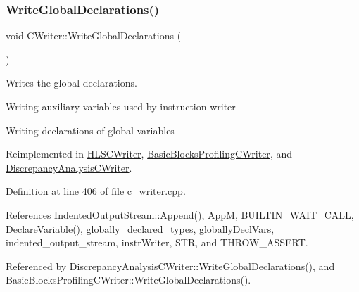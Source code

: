\subsubsection{\texorpdfstring{Write\+Global\+Declarations()}{WriteGlobalDeclarations()}}
{\footnotesize\ttfamily void C\+Writer\+::\+Write\+Global\+Declarations (\begin{DoxyParamCaption}{ }\end{DoxyParamCaption})\hspace{0.3cm}{\ttfamily [virtual]}}



Writes the global declarations. 

Writing auxiliary variables used by instruction writer

Writing declarations of global variables 

Reimplemented in \hyperlink{classHLSCWriter_a6ea23b34e9d1bde20adbef400db94c6f}{H\+L\+S\+C\+Writer}, \hyperlink{classBasicBlocksProfilingCWriter_a96cb6c4a5df56ae5f5b5e65c73e6796d}{Basic\+Blocks\+Profiling\+C\+Writer}, and \hyperlink{classDiscrepancyAnalysisCWriter_a33b017d849ad5c03561e0bd2a72a37a9}{Discrepancy\+Analysis\+C\+Writer}.



Definition at line 406 of file c\+\_\+writer.\+cpp.



References Indented\+Output\+Stream\+::\+Append(), AppM, B\+U\+I\+L\+T\+I\+N\+\_\+\+W\+A\+I\+T\+\_\+\+C\+A\+LL, Declare\+Variable(), globally\+\_\+declared\+\_\+types, globally\+Decl\+Vars, indented\+\_\+output\+\_\+stream, instr\+Writer, S\+TR, and T\+H\+R\+O\+W\+\_\+\+A\+S\+S\+E\+RT.



Referenced by Discrepancy\+Analysis\+C\+Writer\+::\+Write\+Global\+Declarations(), and Basic\+Blocks\+Profiling\+C\+Writer\+::\+Write\+Global\+Declarations().

